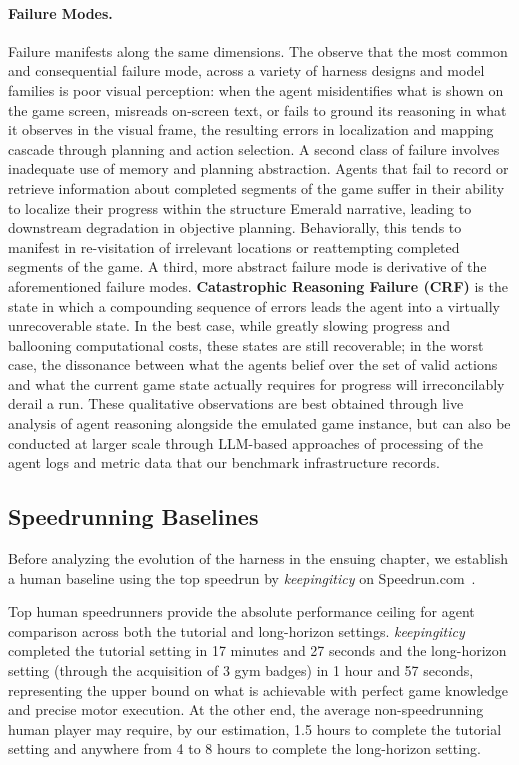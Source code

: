 \paragraph{Failure Modes.} Failure manifests along the same dimensions. The observe that the most common and consequential failure mode, across a variety of harness designs and model families is poor visual perception: when the agent misidentifies what is shown on the game screen, misreads on-screen text, or fails to ground its reasoning in what it observes in the visual frame, the resulting errors in localization and mapping cascade through planning and action selection. A second class of failure involves inadequate use of memory and planning abstraction. Agents that fail to record or retrieve information about completed segments of the game suffer in their ability to localize their progress within the structure \pokemon{} Emerald narrative, leading to downstream degradation in objective planning. Behaviorally, this tends to manifest in re-visitation of irrelevant locations or reattempting completed segments of the game. A third, more abstract failure mode is derivative of the aforementioned failure modes. \textbf{Catastrophic Reasoning Failure (CRF)} is the state in which a compounding sequence of errors leads the agent into a virtually unrecoverable state. In the best case, while greatly slowing progress and ballooning computational costs, these states are still recoverable; in the worst case, the dissonance between what the agents belief over the set of valid actions and what the current game state actually requires for progress will irreconcilably derail a run. These qualitative observations are best obtained through live analysis of agent reasoning alongside the emulated game instance, but can also be conducted at larger scale through LLM-based approaches of processing of the agent logs and metric data that our benchmark infrastructure records.

\subsection{Speedrunning Baselines}\label{sec:baselines}
Before analyzing the evolution of the \pokeagent{} harness in the ensuing chapter, we establish a human baseline using the top speedrun by \textit{keepingiticy} on Speedrun.com~\citep{keepingiticy2024emerald}.

Top human speedrunners provide the absolute performance ceiling for agent comparison across both the tutorial and long-horizon settings. \textit{keepingiticy} completed the tutorial setting in 17 minutes and 27 seconds and the long-horizon setting (through the acquisition of 3 gym badges) in 1 hour and 57 seconds, representing the upper bound on what is achievable with perfect game knowledge and precise motor execution. At the other end, the average non-speedrunning human player may require, by our estimation, 1.5 hours to complete the tutorial setting and anywhere from 4 to 8 hours to complete the long-horizon setting. 
